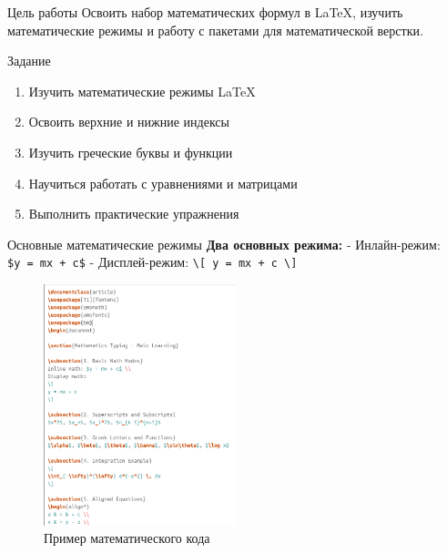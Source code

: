 \begin{frame}{Цель работы}
\label{ux446ux435ux43bux44c-ux440ux430ux431ux43eux442ux44b}
Освоить набор математических формул в LaTeX, изучить математические
режимы и работу с пакетами для математической верстки.
\end{frame}

\begin{frame}{Задание}
\label{ux437ux430ux434ux430ux43dux438ux435}
\begin{enumerate}
\tightlist
\item
  Изучить математические режимы LaTeX
\item
  Освоить верхние и нижние индексы
\item
  Изучить греческие буквы и функции
\item
  Научиться работать с уравнениями и матрицами
\item
  Выполнить практические упражнения
\end{enumerate}
\end{frame}

\begin{frame}[fragile]{Основные математические режимы}
\label{ux43eux441ux43dux43eux432ux43dux44bux435-ux43cux430ux442ux435ux43cux430ux442ux438ux447ux435ux441ux43aux438ux435-ux440ux435ux436ux438ux43cux44b}
\textbf{Два основных режима:} - Инлайн-режим:
\texttt{\$y\ =\ mx\ +\ c\$} - Дисплей-режим:
\texttt{\textbackslash{}{[}\ y\ =\ mx\ +\ c\ \textbackslash{}{]}}

\begin{figure}
\centering
\includegraphics[width=0.5\textwidth,height=\textheight]{image_02.jpg}
\caption{Пример математического кода}
\end{figure}
\end{frame}

